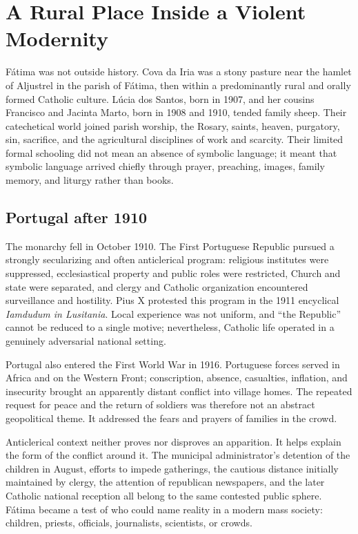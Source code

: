 \section{A Rural Place Inside a Violent Modernity}

Fátima was not outside history. Cova da Iria was a stony pasture near the hamlet of Aljustrel in the parish of Fátima, then within a predominantly rural and orally formed Catholic culture. Lúcia dos Santos, born in 1907, and her cousins Francisco and Jacinta Marto, born in 1908 and 1910, tended family sheep. Their catechetical world joined parish worship, the Rosary, saints, heaven, purgatory, sin, sacrifice, and the agricultural disciplines of work and scarcity. Their limited formal schooling did not mean an absence of symbolic language; it meant that symbolic language arrived chiefly through prayer, preaching, images, family memory, and liturgy rather than books.

\subsection{Portugal after 1910}

The monarchy fell in October 1910. The First Portuguese Republic pursued a strongly secularizing and often anticlerical program: religious institutes were suppressed, ecclesiastical property and public roles were restricted, Church and state were separated, and clergy and Catholic organization encountered surveillance and hostility. Pius X protested this program in the 1911 encyclical \emph{Iamdudum in Lusitania}. Local experience was not uniform, and “the Republic” cannot be reduced to a single motive; nevertheless, Catholic life operated in a genuinely adversarial national setting.

Portugal also entered the First World War in 1916. Portuguese forces served in Africa and on the Western Front; conscription, absence, casualties, inflation, and insecurity brought an apparently distant conflict into village homes. The repeated request for peace and the return of soldiers was therefore not an abstract geopolitical theme. It addressed the fears and prayers of families in the crowd.

Anticlerical context neither proves nor disproves an apparition. It helps explain the form of the conflict around it. The municipal administrator's detention of the children in August, efforts to impede gatherings, the cautious distance initially maintained by clergy, the attention of republican newspapers, and the later Catholic national reception all belong to the same contested public sphere. Fátima became a test of who could name reality in a modern mass society: children, priests, officials, journalists, scientists, or crowds.

